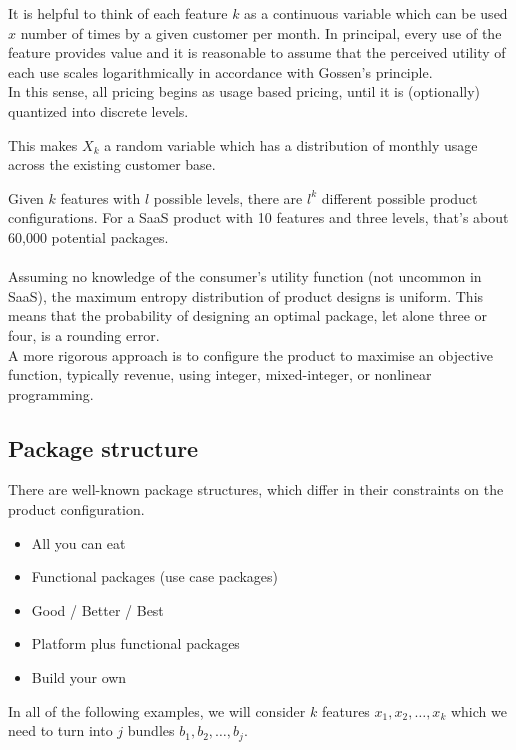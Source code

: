 \documentclass{article}
\begin{document}
It is helpful to think of each feature $k$ as a continuous variable which can be used $x$ number of times by a given customer per month. In principal, every use of the feature provides value and it is reasonable to assume that the perceived utility of each use scales logarithmically in accordance with Gossen's principle.  \\

In this sense, all pricing begins as usage based pricing, until it is (optionally) quantized into discrete levels. 

This makes $X_k$ a random variable which has a distribution of monthly usage across the existing customer base.




Given $k$ features with $l$ possible levels, there are $l^k$ different possible product configurations. For a SaaS product with 10 features and three levels, that's about 60,000 potential packages. \\ \\ Assuming no knowledge of the consumer's utility function (not uncommon in SaaS), the maximum entropy distribution of product designs is uniform. This means that the probability of designing an optimal package, let alone three or four, is a rounding error. \\

A more rigorous approach is to configure the product to maximise an objective function, typically revenue, using integer, mixed-integer, or nonlinear programming.

\subsection{Package structure} 

There are well-known package structures, which differ in their constraints on the product configuration.
\begin{itemize}
\item All you can eat
\item Functional packages (use case packages)
\item Good / Better / Best
\item Platform plus functional packages
\item Build your own
\end{itemize}

In all of the following examples, we will consider \( k \) features \( x_1, x_2, \ldots, x_k \) which we need to turn into \( j \) bundles \( b_1, b_2, \ldots, b_j \). \\
\end{document}
